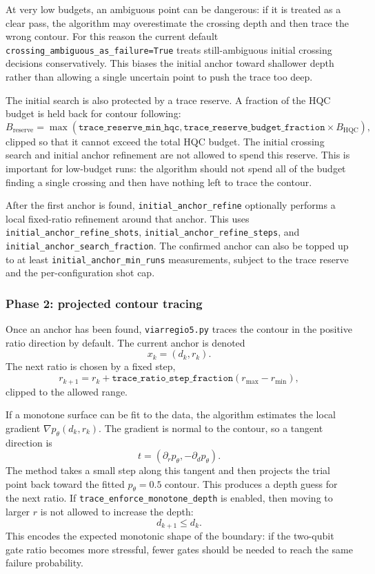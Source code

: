 At very low budgets, an ambiguous point can be dangerous: if it is treated as a
clear pass, the algorithm may overestimate the crossing depth and then trace
the wrong contour.  For this reason the current default
\texttt{crossing\_ambiguous\_as\_failure=True} treats still-ambiguous initial
crossing decisions conservatively.  This biases the initial anchor toward
shallower depth rather than allowing a single uncertain point to push the trace
too deep.

The initial search is also protected by a trace reserve.  A fraction of the HQC
budget is held back for contour following:
\[
    B_{\mathrm{reserve}}
    =
    \max\!\left(
        \texttt{trace\_reserve\_min\_hqc},
        \texttt{trace\_reserve\_budget\_fraction}
        \times
        B_{\mathrm{HQC}}
    \right),
\]
clipped so that it cannot exceed the total HQC budget.  The initial crossing
search and initial anchor refinement are not allowed to spend this reserve.
This is important for low-budget runs: the algorithm should not spend all of
the budget finding a single crossing and then have nothing left to trace the
contour.

After the first anchor is found, \texttt{initial\_anchor\_refine} optionally
performs a local fixed-ratio refinement around that anchor.  This uses
\texttt{initial\_anchor\_refine\_shots},
\texttt{initial\_anchor\_refine\_steps}, and
\texttt{initial\_anchor\_search\_fraction}.  The confirmed anchor can also be
topped up to at least \texttt{initial\_anchor\_min\_runs} measurements, subject
to the trace reserve and the per-configuration shot cap.

\subsubsection{Phase 2: projected contour tracing}

Once an anchor has been found, \texttt{viarregio5.py} traces the contour in the
positive ratio direction by default.  The current anchor is denoted
\[
    x_k = (d_k,r_k).
\]
The next ratio is chosen by a fixed step,
\[
    r_{k+1}
    =
    r_k
    +
    \texttt{trace\_ratio\_step\_fraction}
    (r_{\max}-r_{\min}),
\]
clipped to the allowed range.

If a monotone surface can be fit to the data, the algorithm estimates the local
gradient \(\nabla p_\theta(d_k,r_k)\).  The gradient is normal to the contour,
so a tangent direction is
\[
    t = (\partial_r p_\theta, -\partial_d p_\theta).
\]
The method takes a small step along this tangent and then projects the trial
point back toward the fitted \(p_\theta=0.5\) contour.  This produces a depth
guess for the next ratio.  If \texttt{trace\_enforce\_monotone\_depth} is
enabled, then moving to larger \(r\) is not allowed to increase the depth:
\[
    d_{k+1} \leq d_k.
\]
This encodes the expected monotonic shape of the boundary: if the two-qubit
gate ratio becomes more stressful, fewer gates should be needed to reach the
same failure probability.

